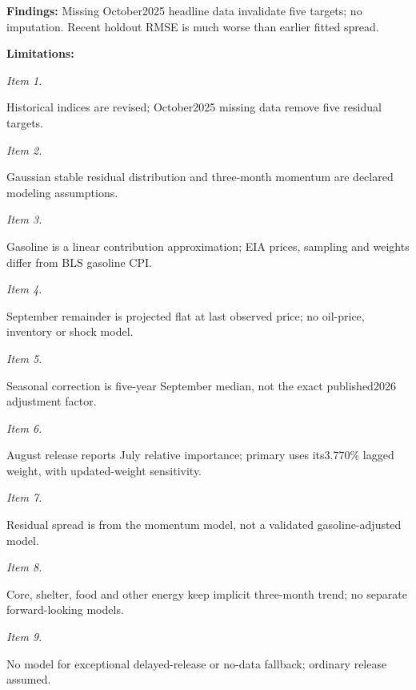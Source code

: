 \documentclass[11pt]{article}
\begin{document}
\par\noindent\textbf{Findings:} Missing October2025 headline data invalidate five targets; no imputation. Recent holdout RMSE is much worse than earlier fitted spread.

\par\noindent\textbf{Limitations:} \par \par\noindent\textit{Item 1.}\par Historical indices are revised; October2025 missing data remove five residual targets.

\par\noindent\textit{Item 2.}\par Gaussian stable residual distribution and three-month momentum are declared modeling assumptions.

\par\noindent\textit{Item 3.}\par Gasoline is a linear contribution approximation; EIA prices, sampling and weights differ from BLS gasoline CPI.

\par\noindent\textit{Item 4.}\par September remainder is projected flat at last observed price; no oil-price, inventory or shock model.

\par\noindent\textit{Item 5.}\par Seasonal correction is five-year September median, not the exact published2026 adjustment factor.

\par\noindent\textit{Item 6.}\par August release reports July relative importance; primary uses its3.770\% lagged weight, with updated-weight sensitivity.

\par\noindent\textit{Item 7.}\par Residual spread is from the momentum model, not a validated gasoline-adjusted model.

\par\noindent\textit{Item 8.}\par Core, shelter, food and other energy keep implicit three-month trend; no separate forward-looking models.

\par\noindent\textit{Item 9.}\par No model for exceptional delayed-release or no-data fallback; ordinary release assumed.
\end{document}
